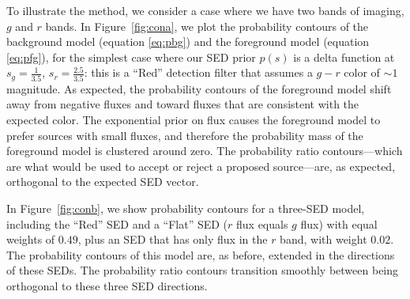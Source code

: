 \documentclass[11pt,letterpaper,linenumbers]{aastex63}
\newcommand{\figref}[1]{\mbox{Figure~\ref{#1}}}
\begin{document}
To illustrate the method, we consider a case where we have two bands
of imaging, $g$ and $r$ bands.  In \figref{fig:cona}, we plot the
probability contours of the background model (equation \ref{eq:pbg})
and the foreground model (equation \ref{eq:pfg}), for the simplest
case where our SED prior $p(s)$ is a delta function at $s_{g} =
\frac{1}{3.5}$, $s_{r} = \frac{2.5}{3.5}$: this is a ``Red'' detection
filter that assumes a $g - r$ color of $\sim 1$ magnitude.  As expected, the
probability contours of the foreground model shift away from negative
fluxes and toward fluxes that are consistent with the expected color.
The exponential prior on flux causes the foreground model to prefer
sources with small fluxes, and therefore the probability mass of the
foreground model is clustered around zero.  The probability ratio
contours---which are what would be used to accept or reject a proposed
source---are, as expected, orthogonal to the expected SED vector.

In \figref{fig:conb}, we show probability contours for a three-SED
model, including the ``Red'' SED and a ``Flat'' SED ($r$ flux equals
$g$ flux) with equal weights of $0.49$, plus an SED that has only flux
in the $r$ band, with weight $0.02$.  The probability contours of this
model are, as before, extended in the directions of these SEDs.  The
probability ratio contours transition smoothly between being
orthogonal to these three SED directions.
\end{document}

